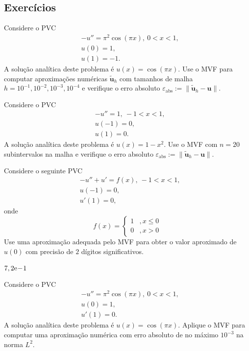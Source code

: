 \subsection{Exercícios}

\begin{exer}
  Considere o PVC
  \begin{align}
    &-u'' = \pi^2\cos(\pi x), ~0 < x < 1,\\
    &u(0) = 1,\\
    &u(1) = -1.
  \end{align}
  A solução analítica deste problema é $u(x) = \cos(\pi x)$. Use o MVF para computar aproximações numéricas $\tilde{\pmb{u}}_h$ com tamanhos de malha $h=10^{-1}, 10^{-2}, 10^{-3}, 10^{-4}$ e verifique o erro absoluto $\varepsilon_{\text{abs}} := \|\tilde{\pmb{u}}_h - \pmb{u}\|$.
\end{exer}

\begin{exer}
  Considere o PVC
  \begin{align}
    &-u'' = 1, ~-1 < x < 1,\\
    &u(-1) = 0,\\
    &u(1) = 0.
  \end{align}
  A solução analítica deste problema é $u(x) = 1-x^2$. Use o MVF com $n=20$ subintervalos na malha e verifique o erro absoluto $\varepsilon_{\text{abs}} := \|\tilde{\pmb{u}}_h - \pmb{u}\|$.
\end{exer}

\begin{exer}
Considere o seguinte PVC
\begin{subequations}
  \begin{align}
    &-u'' + u' = f(x), ~-1 < x < 1,\\
    &u(-1) = 0,\\
    &u'(1) =0,
  \end{align}
\end{subequations}
onde
\begin{equation}
  f(x) = \left\{
    \begin{array}{ll}
      1 &, x\leq 0\\
      0 &, x>0
    \end{array}
  \right.
\end{equation}
Use uma aproximação adequada pelo MVF para obter o valor aproximado de $u(0)$ com precisão de $2$ dígitos significativos.
\end{exer}
\begin{resp}
  $7,2\mathrm{e}\!-\!1$
\end{resp}

\begin{exer}
  Considere o PVC
  \begin{align}
    &-u'' = \pi^2\cos(\pi x), ~0 < x < 1,\\
    &u(0) = 1,\\
    &u'(1) = 0.
  \end{align}
  A solução analítica deste problema é $u(x) = \cos(\pi x)$. Aplique o MVF para computar uma aproximação numérica com erro absoluto de no máximo $10^{-3}$ na norma $L^2$.
\end{exer}
